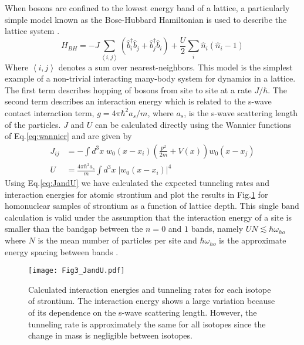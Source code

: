 When bosons are confined to the lowest energy band of a lattice, a particularly simple model known as the Bose-Hubbard Hamiltonian is used to describe the lattice system \cite{Jaksch1998}. 
	\begin{equation} \label{eq:boseHubbard}
		 H_{BH} = -J \sum_{\left< i,j \right>} \left(\hat{b}^{\dagger}_i \hat{b}_j + \hat{b}^{\dagger}_j \hat{b}_i \right)
		 		  + \frac{U}{2} \sum_i \hat{n}_i(\hat{n}_i - 1)
	\end{equation}
Where $\left< i,j \right>$ denotes a sum over nearest-neighbors. This model is the simplest example of a non-trivial interacting many-body system for dynamics in a lattice. The first term describes hopping of bosons from site to site at a rate $J/ \hbar$. The second term describes an interaction energy which is related to the s-wave contact interaction term, $g = 4 \pi \hbar^2 a_s/m$, where $a_s$, is the s-wave scattering length of the particles. $J$ and $U$ can be calculated directly using the Wannier functions of Eq.\;\ref{eq:wannier} and are given by \cite{Jaksch2005}
	\begin{equation} \label{eq:JandU}
	\begin{aligned}
		 J_{ij} &= - \int d^3x \; w_0(x-x_i) \left( \frac{p^2}{2m}+V(x) \right) w_0(x-x_j)\\
		 U &= \frac{4 \pi \hbar^2 a_s}{m} \int d^3x \; \left| w_0(x-x_i)\right|^4
	\end{aligned}
	\end{equation}
Using Eq.\;\ref{eq:JandU} we have calculated the expected tunneling rates and interaction energies for atomic strontium and plot the results in Fig.\;\ref{fig:fig_JandU} for homonuclear samples of strontium as a function of lattice depth. This single band calculation is valid under the assumption that the interaction energy of a site is smaller than the bandgap between the $n= 0$ and $1$ bands, namely $U N \lesssim \hbar \omega_{ho}$ where $N$ is the mean number of particles per site and $\hbar \omega_{ho}$ is the approximate energy spacing between bands \cite{Rey2004}. 
	\begin{figure}
		\centerline{
		\texttt{[image: Fig3\_JandU.pdf]}}
		\caption{Calculated interaction energies and tunneling rates for each isotope of strontium. The interaction energy shows a large variation because of its dependence on the s-wave scattering length. However, the tunneling rate is approximately the same for all isotopes since the change in mass is negligible between isotopes.}
		\label{fig:fig_JandU}
	\end{figure}
